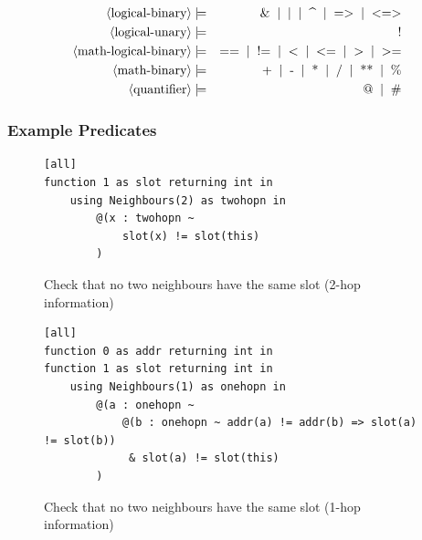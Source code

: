 \begin{eqnarray*}
%
	\pn{logical-binary} & \pp & \sm{\&}  \oo \sm{\textbar} \oo \sm{\textasciicircum} \oo \sm{=\textgreater} \oo \sm{\textless=\textgreater} \\
	\pn{logical-unary} & \pp & \sm{!} \\
	\pn{math-logical-binary} & \pp & \sm{==} \oo \sm{!=} \oo \sm{\textless} \oo \sm{\textless=} \oo \sm{\textgreater} \oo \sm{\textgreater=} \\
	\pn{math-binary} & \pp & \sm{+} \oo \sm{-} \oo \sm{*} \oo \sm{/} \oo \sm{**} \oo \sm{\%} \\
%
%
	\pn{quantifier} & \pp & \sm{@} \oo \sm{\#} \\
\end{eqnarray*}

\subsubsection{Example Predicates}

\begin{figure}[H]
\begin{verbatim}
[all]
function 1 as slot returning int in
    using Neighbours(2) as twohopn in
        @(x : twohopn ~
            slot(x) != slot(this)
        )
\end{verbatim}
\caption{Check that no two neighbours have the same slot (2-hop information)}
\label{fig:two-hop-slot-pred-lang}
\end{figure}

\begin{figure}[H]
\begin{verbatim}
[all]
function 0 as addr returning int in
function 1 as slot returning int in
    using Neighbours(1) as onehopn in
        @(a : onehopn ~
            @(b : onehopn ~ addr(a) != addr(b) => slot(a) != slot(b))
             & slot(a) != slot(this)
        )
\end{verbatim}
\caption{Check that no two neighbours have the same slot (1-hop information)}
\label{fig:one-hop-slot-pred-lang}
\end{figure}


